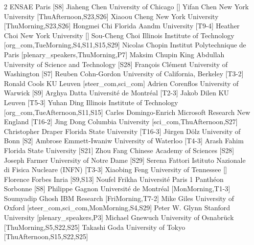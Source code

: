\begin{multicols}{2}
  {ENSAE Paris}
  [S8]
\participantne
  {Jiaheng Chen}
  {University of Chicago}
  []
\participantne
  {Yifan Chen}
  {New York University}
  [ThuAfternoon,S23,S26]
\participantne
  {Xiaoou Cheng}
  {New York University}
  [ThuMorning,S23,S26]
\participantne
  {Hongmei Chi}
  {Florida Aandm University}
  [T9-4]
\participantne
  {Heather Choi}
  {New York University}
  []
\participantne
  {Sou-Cheng Choi}
  {Illinois Institute of Technology}
  [org_com,TueMorning,S4,S11,S15,S29]
\participantne
  {Nicolas Chopin}
  {Institut Polytechnique de Paris}
  [plenary_speakers,ThuMorning,P7]
\participantne
  {Maksim Chupin}
  {King Abdullah University of Science and Technology}
  [S28]
\participantne
  {Fran\c{c}ois Cl\'ement}
  {University of Washington}
  [S7]
\participantne
  {Reuben Cohn-Gordon}
  {University of California, Berkeley}
  [T3-2]
\participantne
  {Ronald Cools}
  {KU Leuven}
  [steer_com,sci_com]
\participantne
  {Adrien Corenflos}
  {University of Warwick}
  [S9]
\participantne
  {Arghya Datta}
  {Universit\'e de Montr\'eal}
  [T2-3]
\participantne
  {Jakob Dilen}
  {KU Leuven}
  [T5-3]
\participantne
  {Yuhan Ding}
  {Illinois Institute of Technology}
  [org_com,TueAfternoon,S11,S15]
\participantne
  {Carles Domingo-Enrich}
  {Microsoft Research New England}
  [T16-2]
\participantne
  {Jing Dong}
  {Columbia University}
  [sci_com,ThuAfternoon,S27]
\participantne
  {Christopher Draper}
  {Florida State University}
  [T16-3]
\participantne
  {J\"urgen D\"olz}
  {University of Bonn}
  [S2]
\participantne
  {Ambrose Emmett-Iwaniw}
  {University of Waterloo}
  [T4-3]
\participantne
  {Arash Fahim}
  {Florida State University}
  [S21]
\participantne
  {Zhou Fang}
  {Chinese Academy of Sciences}
  [S28]
\participantne
  {Joseph Farmer}
  {University of Notre Dame}
  [S29]
\participantne
  {Serena Fattori}
  {Istituto Nazionale di Fisica Nucleare (INFN)}
  [T3-3]
\participantne
  {Xiaobing Feng}
  {University of Tennessee}
  []
\participantne
  {Florence Forbes}
  {Inria}
  [S9,S13]
\participantne
  {Noufel Frikha}
  {Universit\'e Paris 1 Panth\'eon Sorbonne}
  [S8]
\participantne
  {Philippe Gagnon}
  {Universit\'e de Montr\'eal}
  [MonMorning,T1-3]
\participantne
  {Soumyadip Ghosh}
  {IBM Research}
  [FriMorning,T7-2]
\participantne
  {Mike Giles}
  {University of Oxford}
  [steer_com,sci_com,MonMorning,S4,S29]
\participantne
  {Peter W. Glynn}
  {Stanford University}
  [plenary_speakers,P3]
\participantne
  {Michael Gnewuch}
  {University of Osnabr\"uck}
  [ThuMorning,S5,S22,S25]
\participantne
  {Takashi Goda}
  {University of Tokyo}
  [ThuAfternoon,S15,S22,S25]

\end{multicols}

